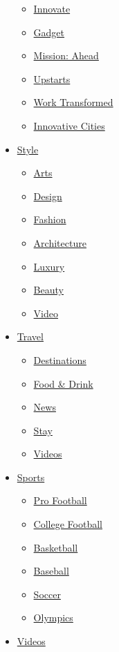 \begin{itemize}
  \begin{itemize}
  \tightlist
  \item
    \href{/specials/tech/innovate}{Innovate}
  \item
    \href{/specials/tech/gadget}{Gadget}
  \item
    \href{/specials/tech/mission-ahead}{Mission: Ahead}
  \item
    \href{/specials/tech/upstarts}{Upstarts}
  \item
    \href{/specials/tech/work-transformed}{Work Transformed}
  \item
    \href{/specials/tech/innovative-cities}{Innovative Cities}
  \end{itemize}
\item
  \href{/style}{Style}

  \begin{itemize}
  \tightlist
  \item
    \href{/style/arts}{Arts}
  \item
    \href{/style/design}{Design}
  \item
    \href{/style/fashion}{Fashion}
  \item
    \href{/style/architecture}{Architecture}
  \item
    \href{/style/luxury}{Luxury}
  \item
    \href{/style/beauty}{Beauty}
  \item
    \href{/style/videos}{Video}
  \end{itemize}
\item
  \href{/travel}{Travel}

  \begin{itemize}
  \tightlist
  \item
    \href{/travel/destinations}{Destinations}
  \item
    \href{/travel/food-and-drink}{Food \& Drink}
  \item
    \href{/travel/news}{News}
  \item
    \href{/travel/stay}{Stay}
  \item
    \href{/travel/videos}{Videos}
  \end{itemize}
\item
  \href{http://bleacherreport.com}{Sports}

  \begin{itemize}
  \tightlist
  \item
    \href{http://bleacherreport.com/nfl}{Pro Football}
  \item
    \href{http://bleacherreport.com/college-football}{College Football}
  \item
    \href{http://bleacherreport.com/nba}{Basketball}
  \item
    \href{http://bleacherreport.com/mlb}{Baseball}
  \item
    \href{http://bleacherreport.com/world-football}{Soccer}
  \item
    \href{/specials/sport/winter-olympics-2018}{Olympics}
  \end{itemize}
\item
  \href{/videos}{Videos}


\end{itemize}
